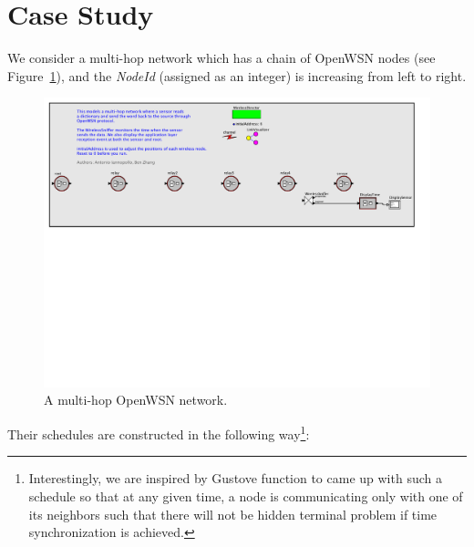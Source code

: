 \section{Case Study}
\label{sec:case-study}

We consider a multi-hop network which has a chain of OpenWSN nodes (see Figure~\ref{fig:multihop}), and the {\em NodeId} (assigned as an integer) is increasing from left to right. 
\begin{figure}[t]
\centering
\includegraphics[width=1\columnwidth]{figures/PaperDemoPtolemy}
\caption{A multi-hop OpenWSN network.}
\label{fig:multihop}
\end{figure}
Their schedules are constructed in the following way\footnote{Interestingly, we are inspired by Gustove function to came up with such a schedule so that at any given time, a node is communicating only with one of its neighbors such that there will not be hidden terminal problem if time synchronization is achieved.}:

